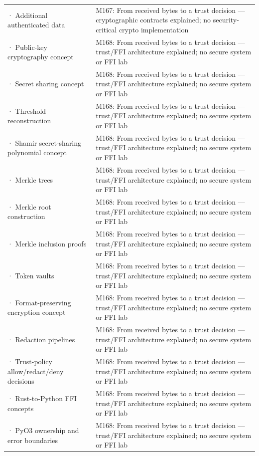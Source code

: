 {\begin{longtable}[]{@{}
  >{\raggedright\arraybackslash}p{}
  >{\raggedright\arraybackslash}p{}@{}}
2784 · Additional authenticated data & M167: From received bytes to a trust decision --- cryptographic contracts explained; no security-critical crypto implementation \\
2785 · Public-key cryptography concept & M168: From received bytes to a trust decision --- trust/FFI architecture explained; no secure system or FFI lab \\
2786 · Secret sharing concept & M168: From received bytes to a trust decision --- trust/FFI architecture explained; no secure system or FFI lab \\
2787 · Threshold reconstruction & M168: From received bytes to a trust decision --- trust/FFI architecture explained; no secure system or FFI lab \\
2788 · Shamir secret-sharing polynomial concept & M168: From received bytes to a trust decision --- trust/FFI architecture explained; no secure system or FFI lab \\
2789 · Merkle trees & M168: From received bytes to a trust decision --- trust/FFI architecture explained; no secure system or FFI lab \\
2790 · Merkle root construction & M168: From received bytes to a trust decision --- trust/FFI architecture explained; no secure system or FFI lab \\
2791 · Merkle inclusion proofs & M168: From received bytes to a trust decision --- trust/FFI architecture explained; no secure system or FFI lab \\
2792 · Token vaults & M168: From received bytes to a trust decision --- trust/FFI architecture explained; no secure system or FFI lab \\
2793 · Format-preserving encryption concept & M168: From received bytes to a trust decision --- trust/FFI architecture explained; no secure system or FFI lab \\
2794 · Redaction pipelines & M168: From received bytes to a trust decision --- trust/FFI architecture explained; no secure system or FFI lab \\
2795 · Trust-policy allow/redact/deny decisions & M168: From received bytes to a trust decision --- trust/FFI architecture explained; no secure system or FFI lab \\
2796 · Rust-to-Python FFI concepts & M168: From received bytes to a trust decision --- trust/FFI architecture explained; no secure system or FFI lab \\
2797 · PyO3 ownership and error boundaries & M168: From received bytes to a trust decision --- trust/FFI architecture explained; no secure system or FFI lab \\

\end{longtable}}
